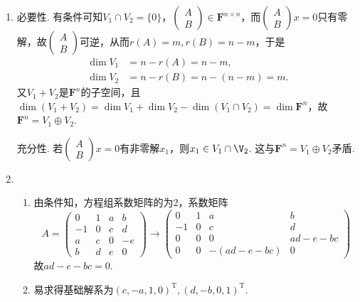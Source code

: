 \begin{enumerate}
    \item 必要性. 有条件可知$V_1\cap V_2=\{0\}$，$\begin{pmatrix}A\\B\end{pmatrix}\in\mathbf{F}^{n\times n}$，而$\begin{pmatrix}A\\B\end{pmatrix}x=0$只有零解，故$\begin{pmatrix}A\\B\end{pmatrix}$可逆，从而$r(A)=m,r(B)=n-m$，于是
          \begin{align*}
              \dim V_1 & =n-r(A)=n-m,       \\
              \dim V_2 & =n-r(B)=n-(n-m)=m.
          \end{align*}
          又$V_1+V_2$是$\mathbf{F}^n$的子空间，且$\dim(V_1+V_2)=\dim V_1+\dim V_2-\dim(V_1\cap V_2)=\dim\mathbf{F}^n$，故$\mathbf{F}^n=V_1\oplus V_2$.

          充分性. 若$\begin{pmatrix}A\\B\end{pmatrix}x=0$有非零解$x_1$，则$x_1\in V_1\cap\V_2$. 这与$\mathbf{F}^n=V_1\oplus V_2$矛盾.

    \item \begin{enumerate}
              \item 由条件知，方程组系数矩阵的为2，系数矩阵
                    \[ A=\begin{pmatrix}
                            0  & 1 & a & b  \\
                            -1 & 0 & c & d  \\
                            a  & c & 0 & -e \\
                            b  & d & e & 0
                        \end{pmatrix}\rightarrow
                        \begin{pmatrix}
                            0  & 1 & a          & b       \\
                            -1 & 0 & c          & d       \\
                            0  & 0 & 0          & ad-e-bc \\
                            0  & 0 & -(ad-e-bc) & 0
                        \end{pmatrix} \]
                    故$ad-e-bc=0$.

              \item 易求得基础解系为$(c,-a,1,0)^\mathrm{T},(d,-b,0,1)^\mathrm{T}$.
          \end{enumerate}
\end{enumerate}

